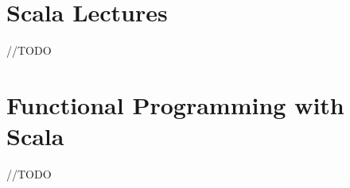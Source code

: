 \appendix
{}\label{A}
\section{Scala Lectures}\label{A.1}
//TODO
\section{Functional Programming with Scala}\label{A.2}
//TODO